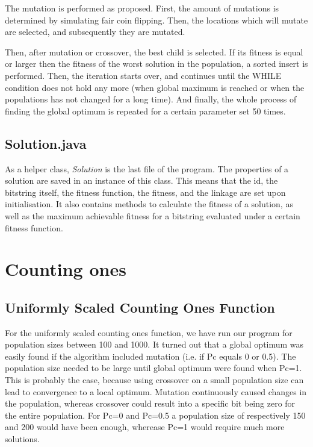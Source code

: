 \documentclass[10pt,a4paper,onecolumn]{article}
\begin{document}
The mutation is performed as proposed. First, the amount of mutations is determined by simulating fair coin flipping. Then, the locations which will mutate are selected, and subsequently they are mutated.

Then, after mutation or crossover, the best child is selected. If its fitness is equal or larger then the fitness of the worst solution in the population, a sorted insert is performed. Then, the iteration starts over, and continues until the WHILE condition does not hold any more (when global maximum is reached or when the populations has not changed for a long time). And finally, the whole process of finding the global optimum is repeated for a certain parameter set 50 times.

\subsection{Solution.java}
As a helper class, \textit{Solution} is the last file of the program. The properties of a solution are saved in an instance of this class. This means that the id, the bitstring itself, the fitness function, the fitness, and the linkage are set upon initialisation. It also contains methods to calculate the fitness of a solution, as well as the maximum achievable fitness for a bitstring evaluated under a certain fitness function.


\section{Counting ones}

\subsection{Uniformly Scaled Counting Ones Function}

For the uniformly scaled counting ones function, we have run our program for population sizes between 100 and 1000.
It turned out that a global optimum was easily found if the algorithm included mutation (i.e. if Pc equals 0 or 0.5).
The population size needed to be large until global optimum were found when Pc=1.
This is probably the case, because using crossover on a small population size can lead to convergence to a local optimum.
Mutation continuously caused changes in the population, whereas crossover could result into a specific bit being zero for the entire population.
For Pc=0 and Pc=0.5 a population size of respectively 150 and 200 would have been enough, wherease Pc=1 would require much more solutions. \\
\end{document}
